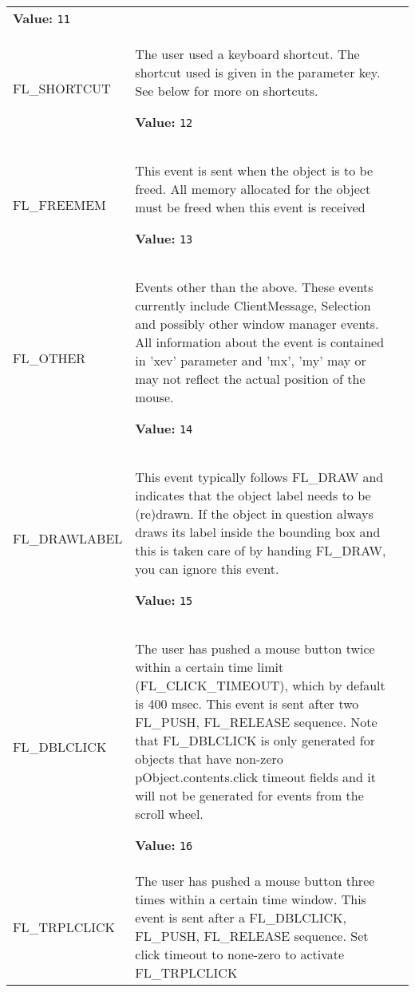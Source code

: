 \begin{longtable}{|p{\varnamewidth}|p{\vardescrwidth}|l}
\textbf{Value:} 
{\tt 11}&\\
\cline{1-2}
\raggedright F\-L\-\_\-S\-H\-O\-R\-T\-C\-U\-T\- & \raggedright The user used a keyboard shortcut. The shortcut used is given in 
          the parameter key. See below for more on shortcuts.

\textbf{Value:} 
{\tt 12}&\\
\cline{1-2}
\raggedright F\-L\-\_\-F\-R\-E\-E\-M\-E\-M\- & \raggedright This event is sent when the object is to be freed. All memory 
          allocated for the object must be freed when this event is 
          received

\textbf{Value:} 
{\tt 13}&\\
\cline{1-2}
\raggedright F\-L\-\_\-O\-T\-H\-E\-R\- & \raggedright Events other than the above. These events currently include 
          ClientMessage, Selection and possibly other window manager 
          events. All information about the event is contained in 'xev' 
          parameter and 'mx', 'my' may or may not reflect the actual 
          position of the mouse.

\textbf{Value:} 
{\tt 14}&\\
\cline{1-2}
\raggedright F\-L\-\_\-D\-R\-A\-W\-L\-A\-B\-E\-L\- & \raggedright This event typically follows FL\_DRAW and indicates that the 
          object label needs to be (re)drawn. If the object in question 
          always draws its label inside the bounding box and this is taken 
          care of by handing FL\_DRAW, you can ignore this event.

\textbf{Value:} 
{\tt 15}&\\
\cline{1-2}
\raggedright F\-L\-\_\-D\-B\-L\-C\-L\-I\-C\-K\- & \raggedright The user has pushed a mouse button twice within a certain time 
          limit (FL\_CLICK\_TIMEOUT), which by default is 400 msec. This 
          event is sent after two FL\_PUSH, FL\_RELEASE sequence. Note that
          FL\_DBLCLICK is only generated for objects that have non-zero 
          pObject.contents.click timeout fields and it will not be 
          generated for events from the scroll wheel.

\textbf{Value:} 
{\tt 16}&\\
\cline{1-2}
\raggedright F\-L\-\_\-T\-R\-P\-L\-C\-L\-I\-C\-K\- & \raggedright The user has pushed a mouse button three times within a certain 
          time window. This event is sent after a FL\_DBLCLICK, FL\_PUSH, 
          FL\_RELEASE sequence. Set click timeout to none-zero to activate 
          FL\_TRPLCLICK


\end{longtable}
